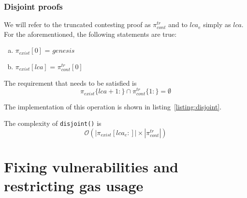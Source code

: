 \subsubsection{Disjoint proofs}

We will refer to the truncated contesting proof as $\pi_{cont}^{tr}$ and to
$lca_{e}$ simply as $lca$. For the aforementioned, the following statements are
true:

\begin{enumerate}[(a)]
    \item  $\pi_{exist}[0]$ = $genesis$
    \item  $\pi_{exist}[lca]$ = $\pi_{cont}^{tr}[0]$
\end{enumerate}

The requirement that needs to be satisfied is
\[\pi_{exist}\{lca+1:\} \cap \pi_{cont}^{tr}\{1:\} = \emptyset \]

The implementation of this operation is shown in
listing~\ref{listing:disjoint}.



The complexity of \texttt{disjoint()} is
\[ \mathcal{O}(|\pi_{exist}[lca_{e}:]| \times
|\pi_{cont}^{tr}|) \]

\section{Fixing vulnerabilities and restricting gas usage}

%
%
